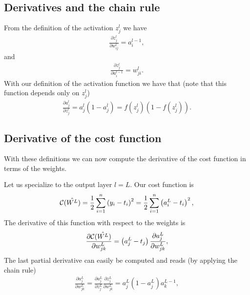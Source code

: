 \documentclass[letterpaper,10pt,english]{sphinxmanual}
\begin{document}
\subsection{Derivatives and the chain rule}
\label{\detokenize{chapter6:derivatives-and-the-chain-rule}}
From the definition of the activation \(z_j^l\) we have
\begin{equation*}
\begin{split}
\frac{\partial z_j^l}{\partial w_{ij}^l} = a_i^{l-1},
\end{split}
\end{equation*}
and
\begin{equation*}
\begin{split}
\frac{\partial z_j^l}{\partial a_i^{l-1}} = w_{ji}^l.
\end{split}
\end{equation*}
With our definition of the activation function we have that (note that this function depends only on \(z_j^l\))
\begin{equation*}
\begin{split}
\frac{\partial a_j^l}{\partial z_j^{l}} = a_j^l(1-a_j^l)=f(z_j^l)(1-f(z_j^l)).
\end{split}
\end{equation*}

\subsection{Derivative of the cost function}
\label{\detokenize{chapter6:derivative-of-the-cost-function}}
With these definitions we can now compute the derivative of the cost function in terms of the weights.

Let us specialize to the output layer \(l=L\). Our cost function is
\begin{equation*}
\begin{split}
{\cal C}(\hat{W^L})  =  \frac{1}{2}\sum_{i=1}^n\left(y_i - t_i\right)^2=\frac{1}{2}\sum_{i=1}^n\left(a_i^L - t_i\right)^2,
\end{split}
\end{equation*}
The derivative of this function with respect to the weights is
\begin{equation*}
\begin{split}
\frac{\partial{\cal C}(\hat{W^L})}{\partial w_{jk}^L}  =  \left(a_j^L - t_j\right)\frac{\partial a_j^L}{\partial w_{jk}^{L}},
\end{split}
\end{equation*}
The last partial derivative can easily be computed and reads (by applying the chain rule)
\begin{equation*}
\begin{split}
\frac{\partial a_j^L}{\partial w_{jk}^{L}} = \frac{\partial a_j^L}{\partial z_{j}^{L}}\frac{\partial z_j^L}{\partial w_{jk}^{L}}=a_j^L(1-a_j^L)a_k^{L-1},
\end{split}
\end{equation*}
\end{document}
